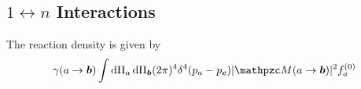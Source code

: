 \documentclass{scrartcl}
\begin{document}
\subsection{\(1 \leftrightarrow n\) Interactions}

The reaction density is given by
\begin{equation}
  \gamma(a \to \vt b) \int \dd \Pi_a \dd \Pi_{\vt b} (2\pi)^4 \delta^4(p_a - p_{\vt c}) \abs{\pzcM(a \to \vt b)}^2 f_a^{(0)}
\end{equation}



\end{document}
